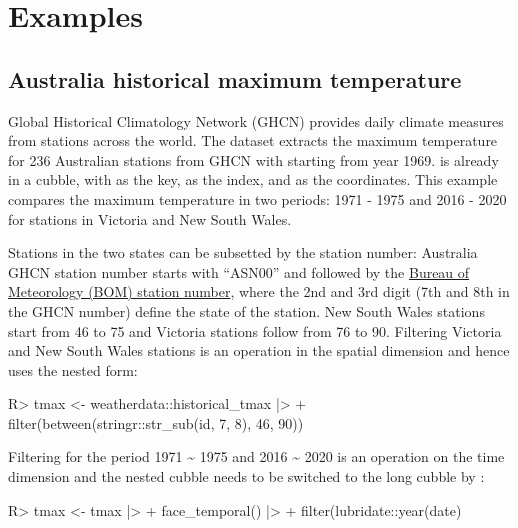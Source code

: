 \documentclass[
]{jss}
\begin{document}
\hypertarget{examples}{%
\section{Examples}\label{examples}}

\hypertarget{australia-historical-maximum-temperature}{%
\subsection{Australia historical maximum
temperature}\label{australia-historical-maximum-temperature}}

Global Historical Climatology Network (GHCN) provides daily climate
measures from stations across the world. The dataset
 extracts the maximum temperature for
236 Australian stations from GHCN with starting from year 1969.
 is already in a cubble, with
 as the key,  as the index, and
 as the coordinates. This example compares
the maximum temperature in two periods: 1971 - 1975 and 2016 - 2020 for
stations in Victoria and New South Wales.

Stations in the two states can be subsetted by the station number:
Australia GHCN station number starts with ``ASN00'' and followed by the
\href{http://www.bom.gov.au/climate/cdo/about/site-num.shtml}{Bureau of
Meteorology (BOM) station number}, where the 2nd and 3rd digit (7th and
8th in the GHCN number) define the state of the station. New South Wales
stations start from 46 to 75 and Victoria stations follow from 76 to 90.
Filtering Victoria and New South Wales stations is an operation in the
spatial dimension and hence uses the nested form:

\begin{CodeChunk}
\begin{CodeInput}
R> tmax <- weatherdata::historical_tmax |>
+   filter(between(stringr::str_sub(id, 7, 8), 46, 90))
\end{CodeInput}
\end{CodeChunk}

Filtering for the period 1971 \textasciitilde{} 1975 and 2016
\textasciitilde{} 2020 is an operation on the time dimension and the
nested cubble needs to be switched to the long cubble by
:

\begin{CodeChunk}
\begin{CodeInput}
R> tmax <- tmax |> 
+   face_temporal() |>
+   filter(lubridate::year(date) %
\end{CodeInput}
\end{CodeChunk}
\end{document}
